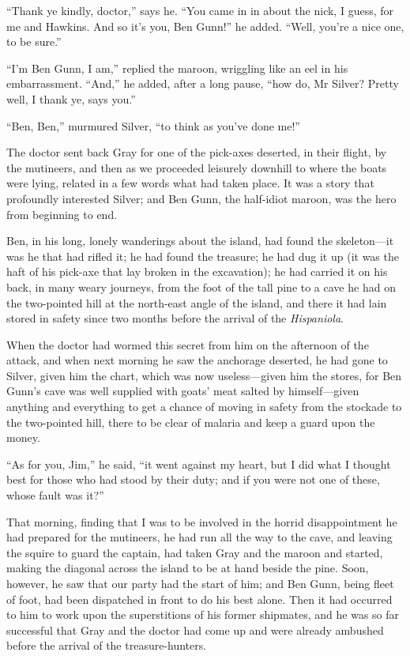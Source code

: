 \enquote{Thank ye kindly, doctor,} says he. \enquote{You came in in about the nick, I guess, for me and Hawkins. And so it’s you, Ben Gunn!} he added. \enquote{Well, you’re a nice one, to be sure.}

\enquote{I’m Ben Gunn, I am,} replied the maroon, wriggling like an eel in his embarrassment. \enquote{And,} he added, after a long pause, \enquote{how do, Mr Silver? Pretty well, I thank ye, says you.}

\enquote{Ben, Ben,} murmured Silver, \enquote{to think as you’ve done me!}

The doctor sent back Gray for one of the pick-axes deserted, in their flight, by the mutineers, and then as we proceeded leisurely downhill to where the boats were lying, related in a few words what had taken place. It was a story that profoundly interested Silver; and Ben Gunn, the half-idiot maroon, was the hero from beginning to end.

Ben, in his long, lonely wanderings about the island, had found the skeleton---it was he that had rifled it; he had found the treasure; he had dug it up (it was the haft of his pick-axe that lay broken in the excavation); he had carried it on his back, in many weary journeys, from the foot of the tall pine to a cave he had on the two-pointed hill at the north-east angle of the island, and there it had lain stored in safety since two months before the arrival of the \textit{Hispaniola}.

When the doctor had wormed this secret from him on the afternoon of the attack, and when next morning he saw the anchorage deserted, he had gone to Silver, given him the chart, which was now useless---given him the stores, for Ben Gunn’s cave was well supplied with goats’ meat salted by himself---given anything and everything to get a chance of moving in safety from the stockade to the two-pointed hill, there to be clear of malaria and keep a guard upon the money.

\enquote{As for you, Jim,} he said, \enquote{it went against my heart, but I did what I thought best for those who had stood by their duty; and if you were not one of these, whose fault was it?}

That morning, finding that I was to be involved in the horrid disappointment he had prepared for the mutineers, he had run all the way to the cave, and leaving the squire to guard the captain, had taken Gray and the maroon and started, making the diagonal across the island to be at hand beside the pine. Soon, however, he saw that our party had the start of him; and Ben Gunn, being fleet of foot, had been dispatched in front to do his best alone. Then it had occurred to him to work upon the superstitions of his former shipmates, and he was so far successful that Gray and the doctor had come up and were already ambushed before the arrival of the treasure-hunters.

